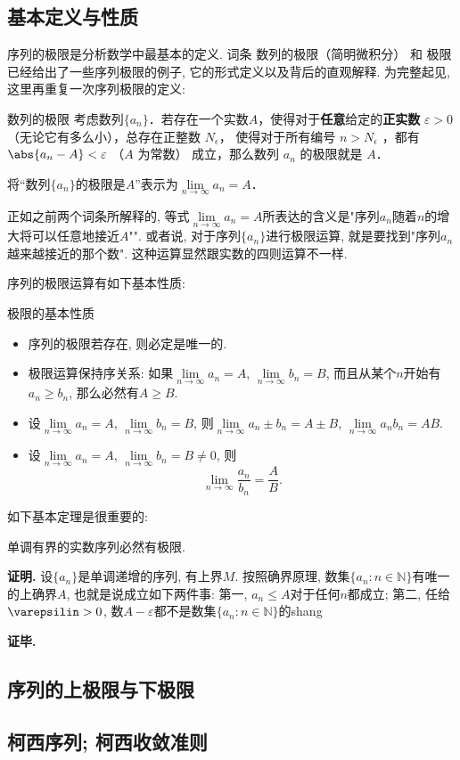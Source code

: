 

\subsection{基本定义与性质}

序列的极限是分析数学中最基本的定义. 词条 数列的极限（简明微积分） 和 极限 已经给出了一些序列极限的例子, 它的形式定义以及背后的直观解释. 为完整起见, 这里再重复一次序列极限的定义:

\begin{definition}{数列的极限}
考虑数列$\{a_n\}$．若存在一个实数$A$，使得对于\textbf{任意}给定的\textbf{正实数} $\varepsilon > 0$（无论它有多么小），总存在正整数 $N_\epsilon$， 使得对于所有编号 $n>N_\epsilon$ ，都有 $\abs{a_n - A} < \varepsilon$ （$A$ 为常数） 成立，那么数列 $a_n$ 的极限就是 $A$．

将“数列$\{a_n\}$的极限是$A$”表示为$\lim\limits_{n\to\infty}a_n=A$．
\end{definition}

正如之前两个词条所解释的, 等式$\lim\limits_{n\to\infty}a_n=A$所表达的含义是"序列$a_n$随着$n$的增大将可以任意地接近$A$"". 或者说, 对于序列$\{a_n\}$进行极限运算, 就是要找到"序列$a_n$越来越接近的那个数". 这种运算显然跟实数的四则运算不一样.

序列的极限运算有如下基本性质:

\begin{theorem}{极限的基本性质}
\begin{itemize}
\item 序列的极限若存在, 则必定是唯一的.
\item 极限运算保持序关系: 如果$\lim\limits_{n\to\infty}a_n=A$, $\lim\limits_{n\to\infty}b_n=B$, 而且从某个$n$开始有$a_n\geq b_n$, 那么必然有$A\geq B$.
\item 设$\lim\limits_{n\to\infty}a_n=A$, $\lim\limits_{n\to\infty}b_n=B$, 则$\lim\limits_{n\to\infty}a_n\pm b_n=A\pm B$, $\lim\limits_{n\to\infty}a_nb_n=AB$.
\item 设$\lim\limits_{n\to\infty}a_n=A$, $\lim\limits_{n\to\infty}b_n=B\neq0$, 则
$$
\lim\limits_{n\to\infty}\frac{a_n}{b_n}=\frac{A}{B}.
$$
\end{itemize}
\end{theorem}

如下基本定理是很重要的:

\begin{theorem}{}
单调有界的实数序列必然有极限.
\end{theorem}
\textbf{证明.} 设$\{a_n\}$是单调递增的序列, 有上界$M$. 按照确界原理, 数集$\{a_n:n\in\mathbb{N}\}$有唯一的上确界$A$, 也就是说成立如下两件事: 第一, $a_n\leq A$对于任何$n$都成立; 第二, 任给$\varepsilin>0$, 数$A-\varepsilon$都不是数集$\{a_n:n\in\mathbb{N}\}$的shang

\textbf{证毕.}

\subsection{序列的上极限与下极限}

\subsection{柯西序列; 柯西收敛准则}